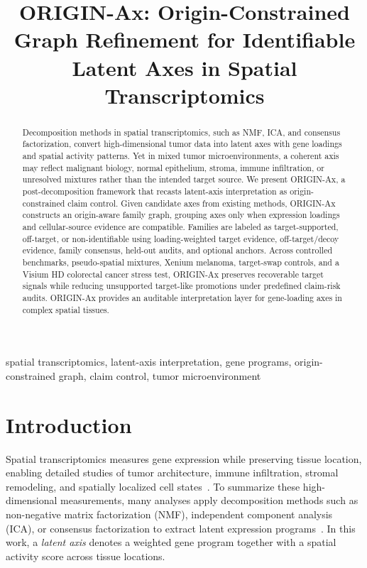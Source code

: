 \documentclass[conference]{IEEEtran}
\begin{document}
\title{ORIGIN-Ax: Origin-Constrained Graph Refinement for Identifiable Latent Axes in Spatial Transcriptomics}

\author{}

\maketitle
\begin{abstract}
Decomposition methods in spatial transcriptomics, such as NMF, ICA, and consensus factorization, convert high-dimensional tumor data into latent axes with gene loadings and spatial activity patterns. Yet in mixed tumor microenvironments, a coherent axis may reflect malignant biology, normal epithelium, stroma, immune infiltration, or unresolved mixtures rather than the intended target source. We present ORIGIN-Ax, a post-decomposition framework that recasts latent-axis interpretation as origin-constrained claim control. Given candidate axes from existing methods, ORIGIN-Ax constructs an origin-aware family graph, grouping axes only when expression loadings and cellular-source evidence are compatible. Families are labeled as target-supported, off-target, or non-identifiable using loading-weighted target evidence, off-target/decoy evidence, family consensus, held-out audits, and optional anchors. Across controlled benchmarks, pseudo-spatial mixtures, Xenium melanoma, target-swap controls, and a Visium HD colorectal cancer stress test, ORIGIN-Ax preserves recoverable target signals while reducing unsupported target-like promotions under predefined claim-risk audits. ORIGIN-Ax provides an auditable interpretation layer for gene-loading axes in complex spatial tissues.
\end{abstract}

\begin{IEEEkeywords}
spatial transcriptomics, latent-axis interpretation, gene programs, origin-constrained graph, claim control, tumor microenvironment
\end{IEEEkeywords}

\section{Introduction}

Spatial transcriptomics measures gene expression while preserving tissue location, enabling detailed studies of tumor architecture, immune infiltration, stromal remodeling, and spatially localized cell states~\cite{stahl2016visualization,tian2023expanding}. To summarize these high-dimensional measurements, many analyses apply decomposition methods such as non-negative matrix factorization (NMF), independent component analysis (ICA), or consensus factorization to extract latent expression programs~\cite{lee1999learning,hyvarinen2000ica,kotliar2019cnmf}. In this work, a \emph{latent axis} denotes a weighted gene program together with a spatial activity score across tissue locations.
\end{document}
